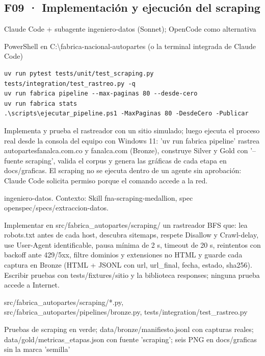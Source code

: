\subsection{F09 · Implementación y ejecución del scraping}\label{fase:F09}
\begin{description}[leftmargin=3.2cm,style=nextline]
\item[1. Herramienta] Claude Code + subagente ingeniero-datos (Sonnet); OpenCode como alternativa
\item[2. Terminal] PowerShell en C:\textbackslash{}fabrica-nacional-autopartes (o la terminal integrada de Claude Code)
\item[3. Comandos] \leavevmode
\begin{lstlisting}[style=ps]
uv run pytest tests/unit/test_scraping.py tests/integration/test_rastreo.py -q
uv run fabrica pipeline --max-paginas 80 --desde-cero
uv run fabrica stats
.\scripts\ejecutar_pipeline.ps1 -MaxPaginas 80 -DesdeCero -Publicar
\end{lstlisting}
\item[4. Explicación] Implementa y prueba el rastreador con un sitio simulado; luego ejecuta el proceso real desde la consola del equipo con Windows 11: 'uv run fabrica pipeline' rastrea autopartesfanalca.com.co y fanalca.com (Bronze), construye Silver y Gold con '--fuente scraping', valida el corpus y genera las gráficas de cada etapa en docs/graficas. El scraping no se ejecuta dentro de un agente sin aprobación: Claude Code solicita permiso porque el comando accede a la red.
\item[5. Agente] ingeniero-datos. Contexto: Skill fna-scraping-medallion, spec openspec/specs/extraccion-datos.
\begin{promptbox}Implementar en src/fabrica\_autopartes/scraping/ un rastreador BFS que: lea robots.txt antes de cada host, descubra sitemaps, respete Disallow y Crawl-delay, use User-Agent identificable, pausa mínima de 2 s, timeout de 20 s, reintentos con backoff ante 429/5xx, filtre dominios y extensiones no HTML y guarde cada captura en Bronze (HTML + JSONL con url, url\_final, fecha, estado, sha256). Escribir pruebas con tests/fixtures/sitio y la biblioteca responses; ninguna prueba accede a Internet.\end{promptbox}
\item[6. Archivos] src/fabrica\_autopartes/scraping/*.py, src/fabrica\_autopartes/pipelines/bronze.py, tests/integration/test\_rastreo.py
\item[7. Pruebas] Pruebas de scraping en verde; data/bronze/manifiesto.jsonl con capturas reales; data/gold/metricas\_etapas.json con fuente 'scraping'; seis PNG en docs/graficas sin la marca 'semilla'

\end{description}
